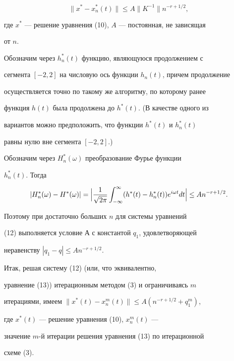 $$


\|x^*-x_n^*(t)\| \le A\|K^{-1}\| n^{-r+1/2},


$$


где $x^*$ --- решение уравнения (10), $A$ --- постоянная, не зависящая


от $ n$.





Обозначим через $h_n^* (t)$ функцию, являющуюся продолжением с


сегмента $[-2,2]$ на числовую ось функции $h_n (t)$, причем продолжение


осуществляется точно по такому же алгоритму, по которому ранее


функция $h(t)$ была продолжена до $h^* (t)$. (В качестве одного из


вариантов можно предположить, что функции $ h^* (t) $ и $ h^*_n (t) $


равны нулю вне сегмента $[-2,2]$.)





Обозначим через $ H_n^* (\omega)$ преобразование Фурье функции


$ h_n^* (t). $ Тогда


$$


|H_n^* (\omega )- H^* (\omega)|=\Bigl|\frac{1}{\sqrt{2\pi}}


\int_{-\infty}^\infty (h^*(t)-h_n^*(t)) e^{i\omega t} dt\Bigr| \le


An^{-r+1/2}.


$$


Поэтому при достаточно больших $ n $ для системы уравнений


(12) выполняется условие А с константой $ q_1$, удовлетворяющей


неравенству $|q_1-q|\le An^{-r+1/2}$.





Итак, решая систему (12) (или, что эквивалентно,


уравнение (13)) итерационным методом (3) и ограничиваясь $ m $


итерациями, имеем $\|x^*(t)-x_n^m(t)\| \le A(n^{-r+1/2}+q_1^m)$,


где $ x^* (t) $ --- решение уравнения (10), $ x_n^m (t) $ ---


значение $m$-й итерации решения уравнения (13) по итерационной


схеме (3).





